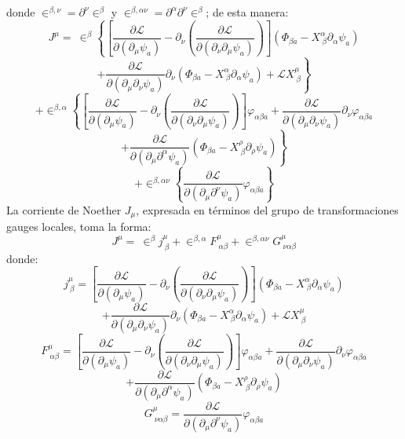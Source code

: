\documentclass[a4paper,12pt]{article}
\begin{document}
donde \mbox{$\in^{\beta,\nu}=\partial^\nu\in^{\beta}$} y \mbox{$\in^{\beta,\alpha\nu}=\partial^\alpha\partial^\nu\in^{\beta}$}; de esta manera:
\begin{equation}
J^\mu=\ \in^\beta\left\{\left[\frac{\partial \mathscr{L} }{\partial(\partial_{\mu} \psi_a)}-\partial_{\nu}\left(\frac{\partial\mathscr{L} }{\partial(\partial_{\nu}\partial_{\mu} \psi_a)}  \right) \right](\Phi_{\beta a}-X_{\ \beta}^\alpha\partial_\alpha\psi_a)\right.
\end{equation}
$$+\left.\frac{\partial\mathscr{L} }{\partial(\partial_{\mu}\partial_{\nu} \psi_a)}\partial_{\nu}(\Phi_{\beta a}-X_{\ \beta}^\alpha\partial_\alpha\psi_a)+\mathscr{L}X_{\ \beta}^\mu\right\}$$
$$+\in^{\beta,\alpha}\left\{\left[\frac{\partial \mathscr{L} }{\partial(\partial_{\mu} \psi_a)}-\partial_{\nu}\left(\frac{\partial\mathscr{L} }{\partial(\partial_{\nu}\partial_{\mu} \psi_a)}  \right) \right]\varphi_{\alpha\beta a}+\frac{\partial\mathscr{L} }{\partial(\partial_{\mu}\partial_{\nu} \psi_a)}\partial_{\nu}\varphi_{\alpha\beta a}\right.$$
$$+\left.\frac{\partial\mathscr{L} }{\partial(\partial_{\mu}\partial^{\alpha} \psi_a)}(\Phi_{\beta a}-X_{\ \beta}^\rho\partial_\rho\psi_a)\right\}$$
$$+\in^{\beta,\alpha\nu}\left\{\frac{\partial\mathscr{L} }{\partial(\partial_{\mu}\partial^{\nu} \psi_a)}\varphi_{\alpha\beta a}\right\}$$
La corriente de Noether $J_\mu$, expresada en términos del grupo de transformaciones gauges locales, toma la forma:
\begin{equation}
J^\mu=\ \in^\beta j^\mu_{\ \beta}+\in^{\beta,\alpha}F^\mu_{\ \alpha\beta}+\in^{\beta,\alpha\nu}G^\mu_{\ \nu\alpha\beta}
\end{equation}
donde:
\begin{equation}
j^\mu_{\ \beta}=\left[\frac{\partial \mathscr{L} }{\partial(\partial_{\mu} \psi_a)}-\partial_{\nu}\left(\frac{\partial\mathscr{L} }{\partial(\partial_{\nu}\partial_{\mu} \psi_a)}  \right) \right](\Phi_{\beta a}-X_{\ \beta}^\alpha\partial_\alpha\psi_a)
\end{equation}
$$+\frac{\partial\mathscr{L} }{\partial(\partial_{\mu}\partial_{\nu} \psi_a)}\partial_{\nu}(\Phi_{\beta a}-X_{\ \beta}^\alpha\partial_\alpha\psi_a)+\mathscr{L}X_{\ \beta}^\mu$$
\begin{equation}
F^\mu_{\ \alpha\beta}=\left[\frac{\partial \mathscr{L} }{\partial(\partial_{\mu} \psi_a)}-\partial_{\nu}\left(\frac{\partial\mathscr{L} }{\partial(\partial_{\nu}\partial_{\mu} \psi_a)}  \right) \right]\varphi_{\alpha\beta a}+\frac{\partial\mathscr{L} }{\partial(\partial_{\mu}\partial_{\nu} \psi_a)}\partial_{\nu}\varphi_{\alpha\beta a}
\end{equation}
$$+\frac{\partial\mathscr{L} }{\partial(\partial_{\mu}\partial^{\alpha} \psi_a)}(\Phi_{\beta a}-X_{\ \beta}^\rho\partial_\rho\psi_a)$$
\begin{equation}
G^\mu_{\ \nu\alpha\beta}=\frac{\partial\mathscr{L} }{\partial(\partial_{\mu}\partial^{\nu} \psi_a)}\varphi_{\alpha\beta a}
\end{equation}
\vspace{0,4cm}
\end{document}
